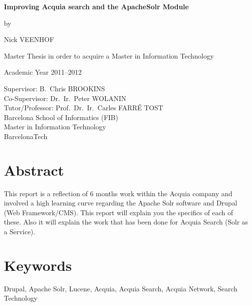
\newpage

{
\setlength{\baselineskip}{14pt}
\setlength{\parindent}{0pt}
\setlength{\parskip}{8pt}

\begin{center}

\noindent \textbf{\huge Improving Acquia search and the ApacheSolr Module\\[8pt]}


by 

Nick VEENHOF

Master Thesis in order to acquire a Master in Information Technology

Academic Year 2011--2012

Supervisor: B.~Chris BROOKINS\\
Co-Supervisor: Dr.~Ir.~Peter WOLANIN\\
Tutor/Professor: Prof.~Dr.~Ir.~Carles FARR\'{E} TOST\\

Barcelona School of Informatics (FIB)\\
Master in Information Technology\\
BarcelonaTech

\end{center}

\section*{Abstract}


This report is a reflection of 6 months work within the Acquia company and involved a high learning curve regarding the Apache Solr software and Drupal (Web Framework/CMS). This report will explain you the specifics of each of these. Also it will explain the work that has been done for Acquia Search (Solr as a Service).

\section*{Keywords}

Drupal, Apache Solr, Lucene, Acquia, Acquia Search, Acquia Network, Search Technology

}

\newpage %
